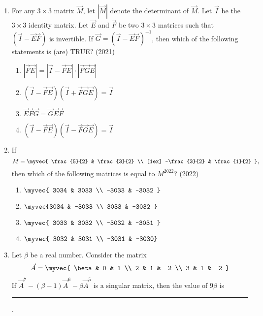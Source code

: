 \begin{enumerate}[label=\thesubsection.\arabic*.,ref=\thesubsection.\theenumi]
    \item For any $3 \times 3$ matrix $\vec{M}$, let $|\vec{M}|$ denote the determinant of $\vec{M}$. Let $\vec{I}$ be the $3 \times 3$ identity matrix. Let $\vec{E}$ and $\vec{F}$ be two $3 \times 3$ matrices such that $(\vec{I} - \vec{E}\vec{F})$ is invertible. If $\vec{G} = (\vec{I} - \vec{E}\vec{F})^{-1}$, then which of the following statements is (are) TRUE?  
    \hfill (2021)
    \begin{multicols}{2}
\begin{enumerate}
         \item $|\vec{F}\vec{E}| = |\vec{I} - \vec{F}\vec{E}| \cdot |\vec{F}\vec{G}\vec{E}|$  
         \item $(\vec{I} - \vec{F}\vec{E})(\vec{I} + \vec{F}\vec{G}\vec{E}) = \vec{I}$  
         \item $\vec{E}\vec{F}\vec{G} = \vec{G}\vec{E}\vec{F}$  
         \item $(\vec{I} - \vec{F}\vec{E})(\vec{I} - \vec{F}\vec{G}\vec{E}) = \vec{I}$
    \end{enumerate}
\end{multicols}
\item If 
$$
M = \myvec{ 
\frac{5}{2} & \frac{3}{2} \\ [1ex]
-\frac{3}{2} & \frac{1}{2} 
},
$$
then which of the following matrices is equal to $ M^{2022} $?
\hfill (2022)
\begin{multicols}{2} \begin{enumerate}
 \item $\myvec{ 3034 & 3033 \\ -3033 & -3032 }$
 \item $\myvec{3034 & -3033 \\ 3033 & -3032 }$
 \item $\myvec{ 3033 & 3032 \\ -3032 & -3031 }$
 \item $\myvec{ 3032 & 3031 \\ -3031 & -3030}$
\end{enumerate} \end{multicols}
\item Let $\beta$ be a real number. Consider the matrix  
	\begin{align*}
		\vec{A} = \myvec{ 
\beta & 0 & 1 \\ 
2 & 1 & -2 \\ 
3 & 1 & -2 
		}
	\end{align*}
If $\vec{A}^7 - (\beta - 1) \vec{A}^6 - \beta \vec{A}^5$ is a singular matrix, then the value of $9\beta$ is \rule{1cm}{0.1pt}.

\end{enumerate}
